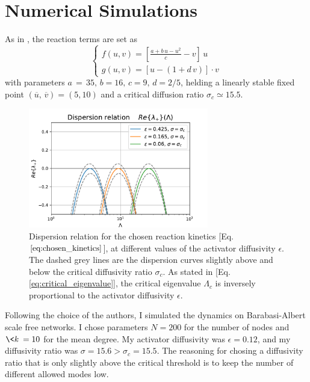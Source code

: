 \section{Numerical Simulations}
As in \cite{main_network}, the reaction terms are set as
\begin{equation}
    \begin{cases}
        f(u,v) = [\frac{a + b\,u -u^2}{c} - v]\, u \\
        g(u, v) = [u - (1+ d\,v)]\cdot v 
    \end{cases}
\label{eq:chosen_kinetics}
\end{equation}
with parameters $a\,=\,35,\, b=16,\, c= 9,\, d= 2/5$, 
helding a linearly stable fixed point $(\overline{u},\, \overline{v}) = (5, 10)$ and a critical diffusion ratio $\sigma_c \simeq 15.5$. \newline \noindent
\begin{figure}[H]
    \centering
    \includegraphics[width=0.7\textwidth]{latex_source/images/turing/multiple_dispersion.pdf}
    \caption{Dispersion relation for the chosen reaction kinetics [Eq. $\ref{eq:chosen_kinetics}$], at different values of the activator diffusivity $\epsilon$. The dashed grey lines are the dispersion curves slightly above and below the critical diffusivity ratio $\sigma_c$. As stated in [Eq. \ref{eq:critical_eigenvalue}], the critical eigenvalue $\Lambda_c$ is inversely proportional to the activator diffusivity $\epsilon$.}
\end{figure}
Following the choice of the authors, I simulated the dynamics on Barabasi-Albert scale free networks. I chose parameters $N = 200$ for the number of nodes and $\<k\> = 10$ for the mean degree. My activator diffusivity was $\epsilon = 0.12$, and my diffusivity ratio was $\sigma = 15.6 > \sigma_c = 15.5$. The reasoning for chosing a diffusivity ratio that is only slightly above the critical threshold is to keep the number of different allowed modes low.
